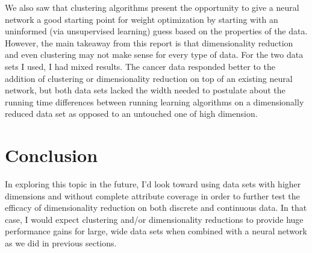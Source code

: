 \documentclass{article}
\begin{document}
    We also saw that clustering algorithms present the opportunity to give a neural network a good starting point for weight optimization by starting with an uninformed (via unsupervised learning) guess based on the properties of the data. However, the main takeaway from this report is that dimensionality reduction and even clustering may not make sense for every type of data. For the two data sets I used, I had mixed results. The cancer data responded better to the addition of clustering or dimensionality reduction on top of an existing neural network, but both data sets lacked the width needed to postulate about the running time differences between running learning algorithms on a dimensionally reduced data set as opposed to an untouched one of high dimension.

  \section{Conclusion}
    In exploring this topic in the future, I'd look toward using data sets with higher dimensions and without complete attribute coverage in order to further test the efficacy of dimensionality reduction on both discrete and continuous data. In that case, I would expect clustering and/or dimensionality reductions to provide huge performance gains for large, wide data sets when combined with a neural network as we did in previous sections.
\end{document}
